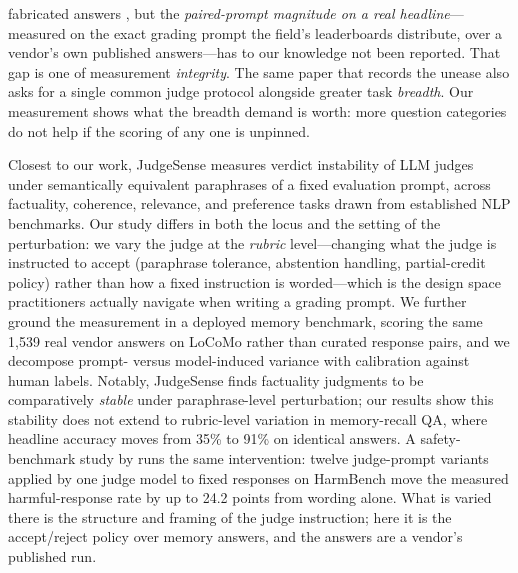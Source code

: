 \documentclass[11pt]{article}
\begin{document}
fabricated answers \citep{locomoaudit}, but the \emph{paired-prompt magnitude on a real headline}---measured on the exact grading prompt the field's leaderboards distribute, over a vendor's own published answers---has to our knowledge not been reported. That gap is one of measurement \emph{integrity}. The same paper that records the unease also asks for a single common judge protocol alongside greater task \emph{breadth}\citep[\S5.4]{synthius}. Our measurement shows what the breadth demand is worth: more question categories do not help if the scoring of any one is unpinned.

Closest to our work, JudgeSense \citep{bellibatlu2026judgesense} measures verdict instability of LLM judges under semantically equivalent paraphrases of a fixed evaluation prompt, across factuality, coherence, relevance, and preference tasks drawn from established NLP benchmarks. Our study differs in both the locus and the setting of the perturbation: we vary the judge at the \emph{rubric} level---changing what the judge is instructed to accept (paraphrase tolerance, abstention handling, partial-credit policy) rather than how a fixed instruction is worded---which is the design space practitioners actually navigate when writing a grading prompt. We further ground the measurement in a deployed memory benchmark, scoring the same 1{,}539 real vendor answers on LoCoMo rather than curated response pairs, and we decompose prompt- versus model-induced variance with calibration against human labels. Notably, JudgeSense finds factuality judgments to be comparatively \emph{stable} under paraphrase-level perturbation; our results show this stability does not extend to rubric-level variation in memory-recall QA, where headline accuracy moves from 35\% to 91\% on identical answers. A safety-benchmark study by \citet{zhang2026judgeconfig} runs the same intervention: twelve judge-prompt variants applied by one judge model to fixed responses on HarmBench move the measured harmful-response rate by up to 24.2 points from wording alone. What is varied there is the structure and framing of the judge instruction; here it is the accept/reject policy over memory answers, and the answers are a vendor's published run.
\end{document}
